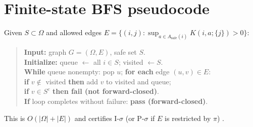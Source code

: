 \documentclass[11pt]{article}
\theoremstyle{plain}
\theoremstyle{definition}
\theoremstyle{remark}
\newcommand{\1}{\mathbbm{1}}
\begin{document}
\section{Finite-state BFS pseudocode}\label{sec:bfs}
Given \(S\subset \Omega\) and allowed edges \(E=\{(i,j): \sup_{a\in A_{\mathrm{safe}}(i)} K(i,a;\{j\})>0\}\):
\begin{quote}\small
\textbf{Input:} graph \(G=(\Omega,E)\), safe set \(S\). \\
\textbf{Initialize:} queue \(\leftarrow\) all \(i\in S\); visited \(\leftarrow S\). \\
\textbf{While} queue nonempty: pop \(u\); \textbf{for each} edge \((u,v)\in E\): \\
\quad \textbf{if} \(v\notin\) visited \textbf{then} add \(v\) to visited and queue; \\
\quad \textbf{if} \(v\in S^c\) \textbf{then fail (not forward-closed)}. \\
\textbf{If} loop completes without failure: \textbf{pass (forward-closed)}.
\end{quote}
This is \(O(|\Omega|+|E|)\) and certifies I-\(\sigma\) (or P-\(\sigma\) if \(E\) is restricted by \(\pi\)) \parencite[Ch.~22]{Cormen2009}.
\vspace{0.5em}

\printbibliography
\end{document}
